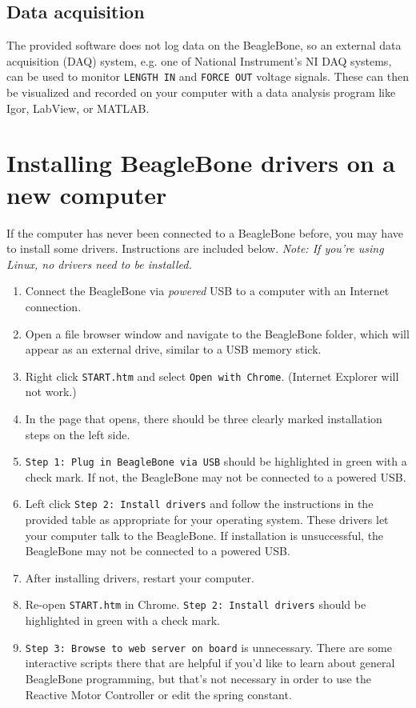 \documentclass[11pt, letterpaper]{article}
\begin{document}
\subsection{Data acquisition}
The provided software does not log data on the BeagleBone, so an external data acquisition (DAQ) system, e.g. one of National Instrument's NI DAQ systems, can be used to monitor \texttt{LENGTH IN} and \texttt{FORCE OUT} voltage signals. These can then be visualized and recorded on your computer with a data analysis program like Igor, LabView, or MATLAB.
	
	
	
\section{Installing BeagleBone drivers on a new computer}
\label{sec:drivers}
If the computer has never been connected to a BeagleBone before, you may have to install some drivers. Instructions are included below.  \textit{Note: If you're using Linux, no drivers need to be installed.}
\begin{enumerate}
	\item Connect the BeagleBone via \emph{powered} USB to a computer with an Internet connection. 
	\item Open a file browser window and navigate to the BeagleBone folder, which will appear as an external drive, similar to a USB memory stick.
	\item Right click \texttt{START.htm} and select \texttt{Open with Chrome}. (Internet Explorer will not work.)
	\item In the page that opens, there should be three clearly marked installation steps on the left side. 
	\item \texttt{Step 1: Plug in BeagleBone via USB} should be highlighted in green with a check mark. If not, the BeagleBone may not be connected to a powered USB.
	\item Left click \texttt{Step 2: Install drivers} and follow the instructions in the provided table as appropriate for your operating system. These drivers let your computer talk to the BeagleBone.  If installation is unsuccessful, the BeagleBone may not be connected to a powered USB.
	\item After installing drivers, restart your computer.
	\item Re-open \texttt{START.htm} in Chrome.  \texttt{Step 2: Install drivers} should be highlighted in green with a check mark.
	\item \texttt{Step 3: Browse to web server on board} is unnecessary. There are some interactive scripts there that are helpful if you'd like to learn about general BeagleBone programming, but that's not necessary in order to use the Reactive Motor Controller or edit the spring constant.
\end{enumerate}
\end{document}
